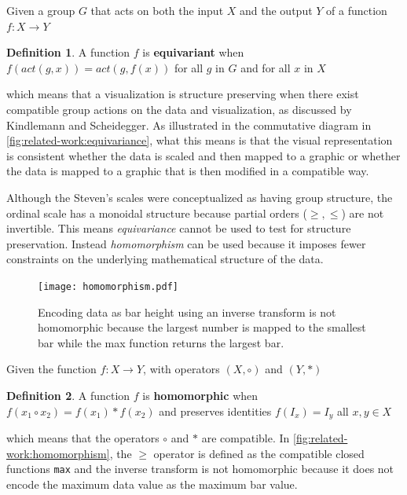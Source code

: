 \documentclass[journal]{IEEEtran}
\theoremstyle{definition}
\newtheorem{definition}{Definition}[section]
\theoremstyle{remark}
\begin{document}
 Given a group $G$ that acts on both the input $X$ and the output $Y$ of a function $f: X \rightarrow Y$

\begin{definition}\label{def:equivariance}
 A function $f$ is \textbf{equivariant} when $f(act(g,x)) = act(g,f(x))$ for all $g$ in $G$ and for all $x$ in $X$ \cite{pittsNominalSetsNames2013}
\end{definition}
which means that a visualization is structure preserving when there exist compatible group actions on the data and visualization, as discussed by Kindlemann and Scheidegger\cite{kindlmannAlgebraicProcessVisualization2014}. As illustrated in the commutative diagram in \autoref{fig:related-work:equivariance}, what this means is that the visual representation is consistent whether the data is scaled and then mapped to a graphic or whether the data is mapped to a graphic that is then modified in a compatible way.

Although the Steven's scales were conceptualized as having group structure, the ordinal scale has a monoidal structure because partial orders ($\geq, \leq$) are not invertible. This means \textit{equivariance} cannot be used to test for structure preservation. Instead \textit{homomorphism} can be used because it imposes fewer constraints on the underlying mathematical structure of the data.
\begin{figure}
  \texttt{[image: homomorphism.pdf]}
  \caption{Encoding data as bar height using an inverse transform is not homomorphic because the largest number is mapped to the smallest bar while the max function returns the largest bar.}
  \label{fig:related-work:homomorphism}
\end{figure}

Given the function $f: X \rightarrow Y$, with operators $(X, \circ)$ and $(Y, *)$

\begin{definition}\label{def:homomorphism}
  A function $f$ is \textbf{homomorphic} when $f(x_1 \circ x_2) = f(x_1) * f(x_2)$ and preserves identities $f(I_x) = I_y$ all $x, y \in X$ \cite{grimaldiDiscreteCombinatorialMathematics2006}
\end{definition}

which means that the operators $\circ$ and $*$ are compatible. In \autoref{fig:related-work:homomorphism}, the $\geq$ operator is defined as the compatible closed functions \texttt{max} and the inverse transform
is not homomorphic because it does not encode the maximum data value as the maximum bar value.
\end{document}
